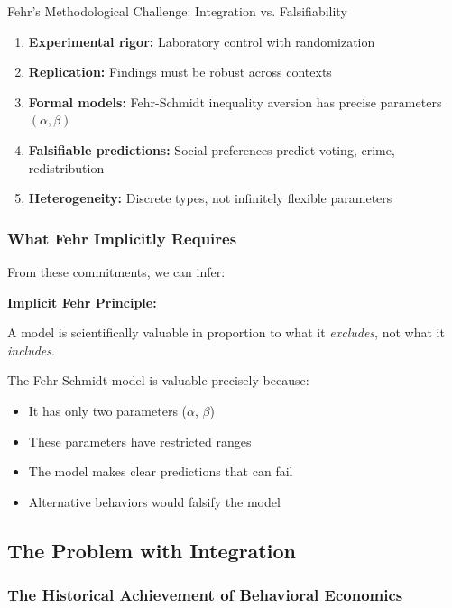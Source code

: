 \begin{chapter}{Fehr's Methodological Challenge: Integration vs. Falsifiability}
\begin{enumerate}
    \item \textbf{Experimental rigor:} Laboratory control with randomization
    \item \textbf{Replication:} Findings must be robust across contexts
    \item \textbf{Formal models:} Fehr-Schmidt inequality aversion has precise parameters $(\alpha, \beta)$
    \item \textbf{Falsifiable predictions:} Social preferences predict voting, crime, redistribution
    \item \textbf{Heterogeneity:} Discrete types, not infinitely flexible parameters
\end{enumerate}

\subsubsection{What Fehr Implicitly Requires}

From these commitments, we can infer:

\begin{tcolorbox}[colback=gray!10!white,colframe=gray!75!black]
\textbf{Implicit Fehr Principle:}

A model is scientifically valuable in proportion to what it \textit{excludes}, not what it \textit{includes}.
\end{tcolorbox}

The Fehr-Schmidt model is valuable precisely because:
\begin{itemize}[noitemsep]
    \item It has only two parameters ($\alpha$, $\beta$)
    \item These parameters have restricted ranges
    \item The model makes clear predictions that can fail
    \item Alternative behaviors would falsify the model
\end{itemize}

\subsection{The Problem with Integration}

\subsubsection{The Historical Achievement of Behavioral Economics}


\end{chapter}
